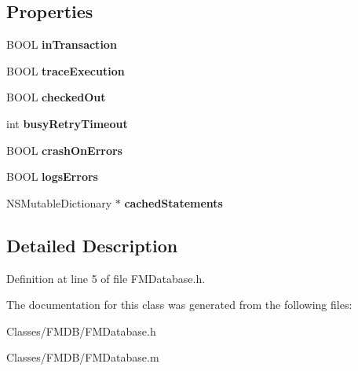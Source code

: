\subsection*{Properties}
\begin{DoxyCompactItemize}
\item 
\hypertarget{interface_f_m_database_a61ce165c427cfc57efe913775812475b}{
BOOL {\bfseries inTransaction}}
\label{interface_f_m_database_a61ce165c427cfc57efe913775812475b}

\item 
\hypertarget{interface_f_m_database_a4bc183e011ee69f872d5fa0f05cb6945}{
BOOL {\bfseries traceExecution}}
\label{interface_f_m_database_a4bc183e011ee69f872d5fa0f05cb6945}

\item 
\hypertarget{interface_f_m_database_a23edca6316673173c0d94a0496703f8e}{
BOOL {\bfseries checkedOut}}
\label{interface_f_m_database_a23edca6316673173c0d94a0496703f8e}

\item 
\hypertarget{interface_f_m_database_ae891eb83b8fac2fb9686f1f7a93882be}{
int {\bfseries busyRetryTimeout}}
\label{interface_f_m_database_ae891eb83b8fac2fb9686f1f7a93882be}

\item 
\hypertarget{interface_f_m_database_a990d4552606048805c0b391daeda8a89}{
BOOL {\bfseries crashOnErrors}}
\label{interface_f_m_database_a990d4552606048805c0b391daeda8a89}

\item 
\hypertarget{interface_f_m_database_af1ceb2fdce07b0dbb0946c85435a562b}{
BOOL {\bfseries logsErrors}}
\label{interface_f_m_database_af1ceb2fdce07b0dbb0946c85435a562b}

\item 
\hypertarget{interface_f_m_database_ab42d841645a304cc8e6ab26654ecc012}{
NSMutableDictionary $\ast$ {\bfseries cachedStatements}}
\label{interface_f_m_database_ab42d841645a304cc8e6ab26654ecc012}

\end{DoxyCompactItemize}


\subsection{Detailed Description}


Definition at line 5 of file FMDatabase.h.



The documentation for this class was generated from the following files:\begin{DoxyCompactItemize}
\item 
Classes/FMDB/FMDatabase.h\item 
Classes/FMDB/FMDatabase.m\end{DoxyCompactItemize}
